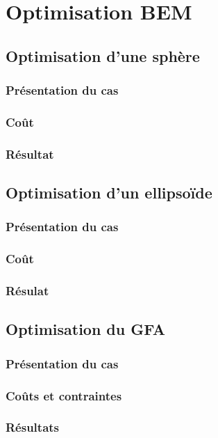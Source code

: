 \chapter{Optimisation BEM}

\section[Optimisation d'une sphère]{Optimisation d'une sphère}
\lipsum
\subsection{Présentation du cas}
\lipsum
\subsection{Coût}
\lipsum
\subsection{Résultat}
\lipsum

\section[Optimisation d'un ellipsoïde]{Optimisation d'un ellipsoïde}
\lipsum
\subsection{Présentation du cas}
\lipsum
\subsection{Coût}
\lipsum
\subsection{Résulat}
\lipsum

\section[Optimisation du GFA]{Optimisation du GFA}
\lipsum
\subsection{Présentation du cas}
\lipsum
\subsection{Coûts et contraintes}
\lipsum
\subsection{Résultats}
\lipsum